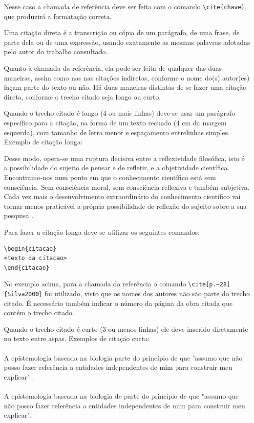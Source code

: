Nesse caso a chamada de referência deve ser feita com o comando \verb|\cite{chave}|, que produzirá a formatação correta.

Uma citação direta é a transcrição ou cópia de um parágrafo, de uma frase, de parte dela ou de uma expressão, usando exatamente as mesmas palavras adotadas pelo autor do trabalho consultado.

Quanto à chamada da referência, ela pode ser feita de qualquer das duas maneiras, assim como nas nas citações indiretas, conforme o nome do(s) autor(es) façam parte do texto ou não. Há duas maneiras distintas de se fazer uma citação direta, conforme o trecho citado seja longo ou curto.

Quando o trecho citado é longo (4 ou mais linhas) deve-se usar um parágrafo específico para a citação, na forma de um texto recuado (4 cm da margem esquerda), com tamanho de letra menor e espaçamento entrelinhas simples. Exemplo de citação longa:
\\\begin{citacao}
Desse modo, opera-se uma ruptura decisiva entre a reflexividade filosófica, isto é a possibilidade do sujeito de pensar e de refletir, e a objetividade científica. Encontramo-nos num ponto em que o conhecimento científico está sem consciência. Sem consciência moral, sem consciência reflexiva e também subjetiva. Cada vez mais o desenvolvimento extraordinário do conhecimento científico vai tornar menos praticável a própria possibilidade de reflexão do sujeito sobre a sua pesquisa \cite[p.~28]{Silva2000}.
\end{citacao}

Para fazer a citação longa deve-se utilizar os seguintes comandos:
\begin{verbatim}
\begin{citacao}
<texto da citacao>
\end{citacao}
\end{verbatim}

No exemplo acima, para a chamada da referência o comando \verb|\cite[p.~28]{Silva2000}| foi utilizado, visto que os nomes dos autores não são parte do trecho citado. É necessário também indicar o número da página da obra citada que contém o trecho citado.

Quando o trecho citado é curto (3 ou menos linhas) ele deve inserido diretamente no texto entre aspas. Exemplos de citação curta:\\
\\A epistemologia baseada na biologia parte do princípio de que "assumo que não posso fazer referência a entidades independentes de mim para construir meu explicar" \cite[p.~35]{Maturana2003}.\\
\\A epistemologia baseada na biologia de  parte do princípio de que "assumo que não posso fazer referência a entidades independentes de mim para construir meu explicar".\\

